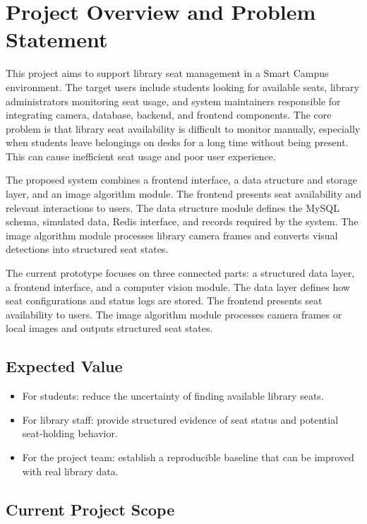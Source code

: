 \section{Project Overview and Problem Statement}

This project aims to support library seat management in a Smart Campus environment. The target users include students looking for available seats, library administrators monitoring seat usage, and system maintainers responsible for integrating camera, database, backend, and frontend components. The core problem is that library seat availability is difficult to monitor manually, especially when students leave belongings on desks for a long time without being present. This can cause inefficient seat usage and poor user experience.

The proposed system combines a frontend interface, a data structure and storage layer, and an image algorithm module. The frontend presents seat availability and relevant interactions to users. The data structure module defines the MySQL schema, simulated data, Redis interface, and records required by the system. The image algorithm module processes library camera frames and converts visual detections into structured seat states.

The current prototype focuses on three connected parts: a structured data layer, a frontend interface, and a computer vision module. The data layer defines how seat configurations and status logs are stored. The frontend presents seat availability to users. The image algorithm module processes camera frames or local images and outputs structured seat states.

\subsection{Expected Value}

\begin{itemize}
  \item For students: reduce the uncertainty of finding available library seats.
  \item For library staff: provide structured evidence of seat status and potential seat-holding behavior.
  \item For the project team: establish a reproducible baseline that can be improved with real library data.
\end{itemize}

\subsection{Current Project Scope}

